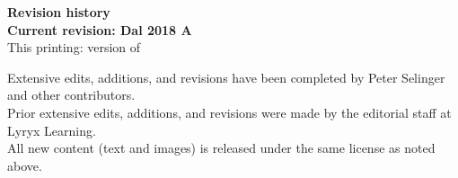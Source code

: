 \thispagestyle{plain}


\setlength{\parskip}{0pt}

\begin{center}
  \fontsize{14pt}{16pt}\selectfont\textcolor{titletextcolour}{\textbf{Revision history \\ \smallskip  Current revision: Dal 2018 A}}
  \\\bigskip\fontsize{10pt}{12pt}\selectfont\textcolor{titletextcolour}{This
    printing: version {\revid} of {\revdate}}
\end{center}

{\footnotesize

  \begin{center}
    Extensive edits, additions, and revisions have been completed by
    Peter Selinger and other contributors. \\
    Prior extensive edits, additions, and revisions were made by the
    editorial staff at Lyryx Learning. \\
    All new content (text and images) is released under the same
    license as noted above.
  \end{center}

}
